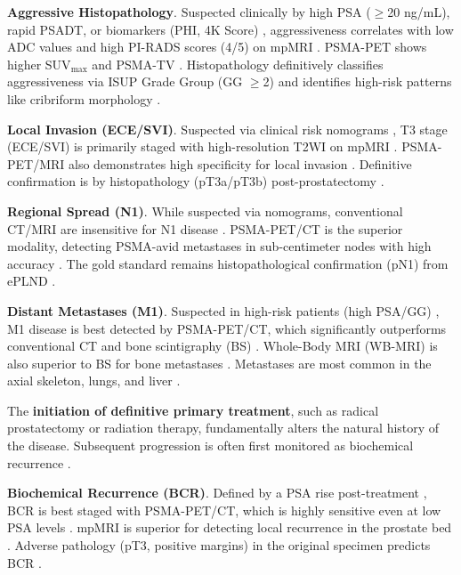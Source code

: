 \documentclass[11pt, a4paper]{article}
\begin{document}
\textbf{Aggressive Histopathology}. Suspected clinically by high PSA ($\geq$20 ng/mL), rapid PSADT, or biomarkers (PHI, 4K Score) \cite{BalzsAntal2021}, aggressiveness correlates with low ADC values and high PI-RADS scores (4/5) on mpMRI \cite{GinsburgRusu2014}. PSMA-PET shows higher SUV$_{\text{max}}$ and PSMA-TV \cite{VetroneMei2023,ShiYu2024}. Histopathology definitively classifies aggressiveness via ISUP Grade Group (GG $\geq$2) and identifies high-risk patterns like cribriform morphology \cite{DuenwegFang2022}.

\textbf{Local Invasion (ECE/SVI)}. Suspected via clinical risk nomograms \cite{OliveiraFerreira2023}, T3 stage (ECE/SVI) is primarily staged with high-resolution T2WI on mpMRI \cite{OliveiraFerreira2023}. PSMA-PET/MRI also demonstrates high specificity for local invasion \cite{HvittfeldtHedeer2025}. Definitive confirmation is by histopathology (pT3a/pT3b) post-prostatectomy \cite{ErbayOzden2020}.

\textbf{Regional Spread (N1)}. While suspected via nomograms, conventional CT/MRI are insensitive for N1 disease \cite{RenYuan2015}. PSMA-PET/CT is the superior modality, detecting PSMA-avid metastases in sub-centimeter nodes with high accuracy \cite{AmalachandranSivathapandi2024}. The gold standard remains histopathological confirmation (pN1) from ePLND \cite{SchilhamKstersVandevelde2022}.

\textbf{Distant Metastases (M1)}. Suspected in high-risk patients (high PSA/GG) \cite{MohseniniaZamaniSiahkali2024}, M1 disease is best detected by PSMA-PET/CT, which significantly outperforms conventional CT and bone scintigraphy (BS) \cite{AmalachandranSivathapandi2024}. Whole-Body MRI (WB-MRI) is also superior to BS for bone metastases \cite{VargasSchorBardach2016}. Metastases are most common in the axial skeleton, lungs, and liver \cite{BangAhn2025}.

\par
The \textbf{initiation of definitive primary treatment}, such as radical prostatectomy or radiation therapy, fundamentally alters the natural history of the disease. Subsequent progression is often first monitored as biochemical recurrence \cite{AmalachandranSivathapandi2024}.

\textbf{Biochemical Recurrence (BCR)}. Defined by a PSA rise post-treatment \cite{ShiYu2024}, BCR is best staged with PSMA-PET/CT, which is highly sensitive even at low PSA levels \cite{AmalachandranSivathapandi2024,RenYuan2015}. mpMRI is superior for detecting local recurrence in the prostate bed \cite{AmalachandranSivathapandi2024,ShiYu2024}. Adverse pathology (pT3, positive margins) in the original specimen predicts BCR \cite{AteDemirel2024}.
\end{document}
